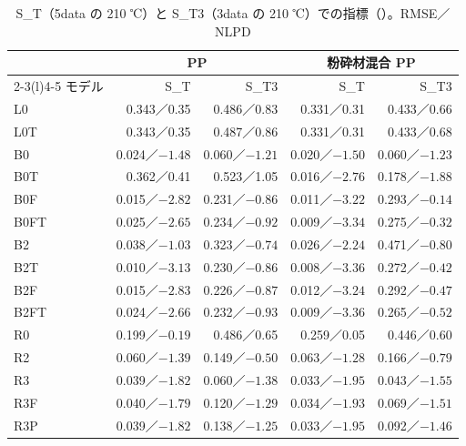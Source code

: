 \documentclass[paper=a4paper,fontsize=10.5pt,line_length=44zw,number_of_lines=38]{jlreq}
\newcommand{\file}[1]{\texttt{\detokenize{#1}}}
\begin{document}
\begin{table}[H]
\caption{S\_T（5data の 210 ℃）と S\_T3（3data の 210 ℃）での指標（\file{metrics.csv}）。RMSE／NLPD}\label{tab:st}
\begin{tabularx}{\linewidth}{@{}l*{4}{r}@{}}
\toprule
 & \multicolumn{2}{c}{PP} & \multicolumn{2}{c}{粉砕材混合 PP} \\
\cmidrule(lr){2-3}\cmidrule(l){4-5}
モデル & S\_T & S\_T3 & S\_T & S\_T3 \\
\midrule
L0 & 0.343／0.35 & 0.486／0.83 & 0.331／0.31 & 0.433／0.66 \\
L0T & 0.343／0.35 & 0.487／0.86 & 0.331／0.31 & 0.433／0.68 \\
B0 & 0.024／$-1.48$ & 0.060／$-1.21$ & 0.020／$-1.50$ & 0.060／$-1.23$ \\
B0T & 0.362／0.41 & 0.523／1.05 & 0.016／$-2.76$ & 0.178／$-1.88$ \\
B0F & 0.015／$-2.82$ & 0.231／$-0.86$ & 0.011／$-3.22$ & 0.293／$-0.14$ \\
B0FT & 0.025／$-2.65$ & 0.234／$-0.92$ & 0.009／$-3.34$ & 0.275／$-0.32$ \\
B2 & 0.038／$-1.03$ & 0.323／$-0.74$ & 0.026／$-2.24$ & 0.471／$-0.80$ \\
B2T & 0.010／$-3.13$ & 0.230／$-0.86$ & 0.008／$-3.36$ & 0.272／$-0.42$ \\
B2F & 0.015／$-2.83$ & 0.226／$-0.87$ & 0.012／$-3.24$ & 0.292／$-0.47$ \\
B2FT & 0.024／$-2.66$ & 0.232／$-0.93$ & 0.009／$-3.36$ & 0.265／$-0.52$ \\
R0 & 0.199／$-0.19$ & 0.486／0.65 & 0.259／0.05 & 0.446／0.60 \\
R2 & 0.060／$-1.39$ & 0.149／$-0.50$ & 0.063／$-1.28$ & 0.166／$-0.79$ \\
R3 & 0.039／$-1.82$ & 0.060／$-1.38$ & 0.033／$-1.95$ & 0.043／$-1.55$ \\
R3F & 0.040／$-1.79$ & 0.120／$-1.29$ & 0.034／$-1.93$ & 0.069／$-1.51$ \\
R3P & 0.039／$-1.82$ & 0.138／$-1.25$ & 0.033／$-1.95$ & 0.092／$-1.46$ \\
\bottomrule
\end{tabularx}
\end{table}
\end{document}
